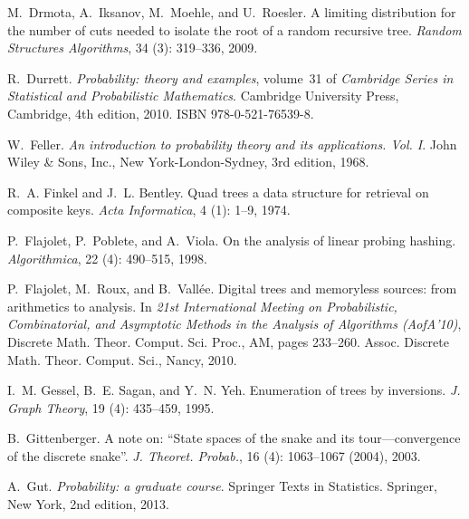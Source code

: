 \documentclass[11pt]{article}
\numberwithin{theorem}{section}
\theoremstyle{definition}
\numberwithin{equation}{section}
\begin{document}
\begin{thebibliography}{55}
M.~Drmota, A.~Iksanov, M.~Moehle, and U.~Roesler.
\newblock A limiting distribution for the number of cuts needed to isolate the
  root of a random recursive tree.
\newblock \emph{Random Structures Algorithms}, 34 (3):
  319--336, 2009.

R.~Durrett.
\newblock \emph{Probability: theory and examples}, volume~31 of \emph{Cambridge
  Series in Statistical and Probabilistic Mathematics}.
\newblock Cambridge University Press, Cambridge, 4th edition, 2010.
\newblock ISBN 978-0-521-76539-8.

W.~Feller.
\newblock \emph{An introduction to probability theory and its applications.
  {V}ol. {I}}.
\newblock John Wiley \& Sons, Inc., New York-London-Sydney, 3rd edition, 1968.

R.~A. Finkel and J.~L. Bentley.
\newblock Quad trees a data structure for retrieval on composite keys.
\newblock \emph{Acta Informatica}, 4 (1): 1--9, 1974.

P.~Flajolet, P.~Poblete, and A.~Viola.
\newblock On the analysis of linear probing hashing.
\newblock \emph{Algorithmica}, 22 (4): 490--515, 1998.

P.~Flajolet, M.~Roux, and B.~Vall\'ee.
\newblock Digital trees and memoryless sources: from arithmetics to analysis.
\newblock In \emph{21st {I}nternational {M}eeting on {P}robabilistic,
  {C}ombinatorial, and {A}symptotic {M}ethods in the {A}nalysis of {A}lgorithms
  ({A}of{A}'10)}, Discrete Math. Theor. Comput. Sci. Proc., AM, pages 233--260.
  Assoc. Discrete Math. Theor. Comput. Sci., Nancy, 2010.

I.~M. Gessel, B.~E. Sagan, and Y.~N. Yeh.
\newblock Enumeration of trees by inversions.
\newblock \emph{J. Graph Theory}, 19 (4): 435--459, 1995.

B.~Gittenberger.
\newblock A note on: ``{S}tate spaces of the snake and its tour---convergence
  of the discrete snake''.
\newblock \emph{J. Theoret. Probab.}, 16 (4): 1063--1067
  (2004), 2003.

A.~Gut.
\newblock \emph{Probability: a graduate course}.
\newblock Springer Texts in Statistics. Springer, New York, 2nd edition, 2013.


\end{thebibliography}
\end{document}
